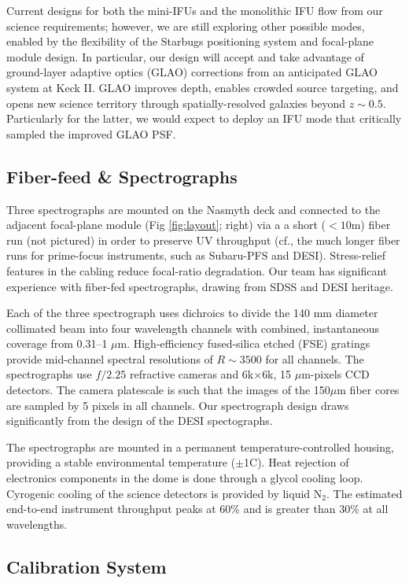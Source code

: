 \documentclass[oneside,11pt]{amsart}
\begin{document}
Current designs for both the mini-IFUs and the monolithic IFU flow
from our science requirements; however, we are still exploring other
possible modes, enabled by the flexibility of the Starbugs
positioning system and focal-plane module design. In particular, our
design will accept and take advantage of ground-layer adaptive optics
(GLAO) corrections from an anticipated GLAO system at Keck II. GLAO
improves depth, enables crowded source targeting, and opens new
science territory through spatially-resolved galaxies beyond
$z\sim0.5$. Particularly for the latter, we would expect to deploy an
IFU mode that critically sampled the improved GLAO PSF.

\subsection{Fiber-feed \& Spectrographs}

Three spectrographs are mounted on the Nasmyth deck and connected to
the adjacent focal-plane module (Fig \ref{fig:layout}; right) via a a
short ($< 10$m) fiber run (not pictured) in order to preserve UV
throughput (cf., the much longer fiber runs for prime-focus
instruments, such as Subaru-PFS and DESI). Stress-relief features in
the cabling reduce focal-ratio degradation. Our team has significant
experience with fiber-fed spectrographs, drawing from SDSS and DESI
heritage.

Each of the three spectrograph uses dichroics to divide the 140 mm
diameter collimated beam into four wavelength channels with combined,
instantaneous coverage from 0.31--1 $\mu$m. High-efficiency
fused-silica etched (FSE) gratings provide mid-channel spectral
resolutions of $R \sim 3500$ for all channels. The spectrographs use
$f/2.25$ refractive cameras and 6k$\times$6k, 15 $\mu$m-pixels CCD
detectors. The camera platescale is such that the images of the
150$\mu$m fiber cores are sampled by 5 pixels in all channels. Our
spectrograph design draws significantly from the design of the DESI
spectographs.

The spectrographs are mounted in a permanent temperature-controlled
housing, providing a stable environmental temperature ($\pm$1C). Heat
rejection of electronics components in the dome is done through a
glycol cooling loop. Cyrogenic cooling of the science detectors is
provided by liquid N$_2$. The estimated end-to-end instrument
throughput peaks at 60\% and is greater than 30\% at all wavelengths.

\subsection{Calibration System}
\end{document}
